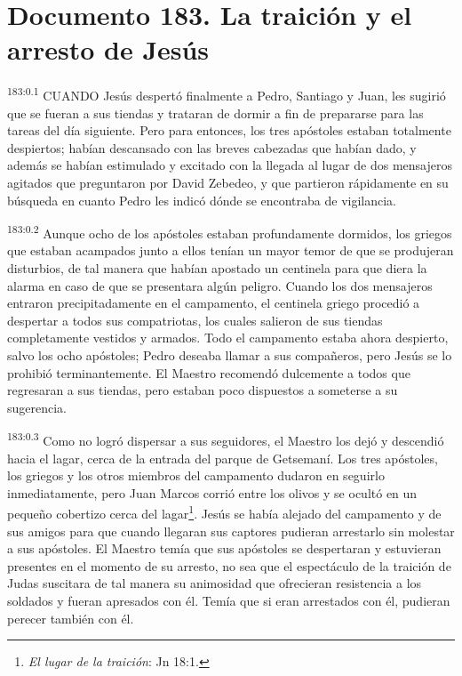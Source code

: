 \chapter{Documento 183. La traición y el arresto de Jesús}
\par 
\textsuperscript{183:0.1} CUANDO Jesús despertó finalmente a Pedro, Santiago y Juan, les sugirió que se fueran a sus tiendas y trataran de dormir a fin de prepararse para las tareas del día siguiente. Pero para entonces, los tres apóstoles estaban totalmente despiertos; habían descansado con las breves cabezadas que habían dado, y además se habían estimulado y excitado con la llegada al lugar de dos mensajeros agitados que preguntaron por David Zebedeo, y que partieron rápidamente en su búsqueda en cuanto Pedro les indicó dónde se encontraba de vigilancia.

\par 
\textsuperscript{183:0.2} Aunque ocho de los apóstoles estaban profundamente dormidos, los griegos que estaban acampados junto a ellos tenían un mayor temor de que se produjeran disturbios, de tal manera que habían apostado un centinela para que diera la alarma en caso de que se presentara algún peligro. Cuando los dos mensajeros entraron precipitadamente en el campamento, el centinela griego procedió a despertar a todos sus compatriotas, los cuales salieron de sus tiendas completamente vestidos y armados. Todo el campamento estaba ahora despierto, salvo los ocho apóstoles; Pedro deseaba llamar a sus compañeros, pero Jesús se lo prohibió terminantemente. El Maestro recomendó dulcemente a todos que regresaran a sus tiendas, pero estaban poco dispuestos a someterse a su sugerencia.

\par 
\textsuperscript{183:0.3} Como no logró dispersar a sus seguidores, el Maestro los dejó y descendió hacia el lagar, cerca de la entrada del parque de Getsemaní. Los tres apóstoles, los griegos y los otros miembros del campamento dudaron en seguirlo inmediatamente, pero Juan Marcos corrió entre los olivos y se ocultó en un pequeño cobertizo cerca del lagar\footnote{\textit{El lugar de la traición}: Jn 18:1.}. Jesús se había alejado del campamento y de sus amigos para que cuando llegaran sus captores pudieran arrestarlo sin molestar a sus apóstoles. El Maestro temía que sus apóstoles se despertaran y estuvieran presentes en el momento de su arresto, no sea que el espectáculo de la traición de Judas suscitara de tal manera su animosidad que ofrecieran resistencia a los soldados y fueran apresados con él. Temía que si eran arrestados con él, pudieran perecer también con él.

